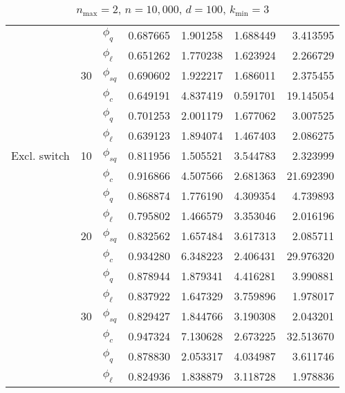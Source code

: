\begin{table}[]
{\begin{tabular}{l@{\hskip 12pt}l@{\hskip 12pt}l@{\hskip 12pt}r@{\hskip 12pt}r@{\hskip 12pt}r@{\hskip 12pt}r}
            &    &$\phi_{q}$ &  0.687665 &  1.901258 &    1.688449 &   3.413595 \\
            &    &$\phi_{\ell}$ &  0.651262 &  1.770238 &    1.623924 &   2.266729 \\\cmidrule{2-7}
            & 30 &$\phi_{sq}$ &  0.690602 &  1.922217 &    1.686011 &   2.375455 \\
            &    &$\phi_{c}$ &  0.649191 &  4.837419 &    0.591701 &  19.145054 \\
            &    &$\phi_{q}$ &  0.701253 &  2.001179 &    1.677062 &   3.007525 \\
            &    &$\phi_{\ell}$ &  0.639123 &  1.894074 &    1.467403 &   2.086275 \\\midrule
Excl. switch & 10 &$\phi_{sq}$ &  0.811956 &  1.505521 &    3.544783 &   2.323999 \\
            &    &$\phi_{c}$ &  0.916866 &  4.507566 &    2.681363 &  21.692390 \\
            &    &$\phi_{q}$ &  0.868874 &  1.776190 &    4.309354 &   4.739893 \\
            &    & $\phi_{\ell}$ &  0.795802 &  1.466579 &    3.353046 &   2.016196 \\\cmidrule{2-7}
            & 20 &$\phi_{sq}$ &  0.832562 &  1.657484 &    3.617313 &   2.085711 \\
            &    &$\phi_{c}$ &  0.934280 &  6.348223 &    2.406431 &  29.976320 \\
            &    &$\phi_{q}$ &  0.878944 &  1.879341 &    4.416281 &   3.990881 \\
            &    & $\phi_{\ell}$ &  0.837922 &  1.647329 &    3.759896 &   1.978017 \\\cmidrule{2-7}
            & 30 &$\phi_{sq}$ &  0.829427 &  1.844766 &    3.190308 &   2.043201 \\
            &    &$\phi_{c}$ &  0.947324 &  7.130628 &    2.673225 &  32.513670 \\
            &    &$\phi_{q}$ &  0.878830 &  2.053317 &    4.034987 &   3.611746 \\
            &    & $\phi_{\ell}$ &  0.824936 &  1.838879 &    3.118728 &   1.978836 \\
\bottomrule
\end{tabular}}
    \caption{$n_{\max}=2$, $n=10,\!000$, $d=100$, $k_{\min}=3$}
    \label{tab:eff2}
\end{table}
